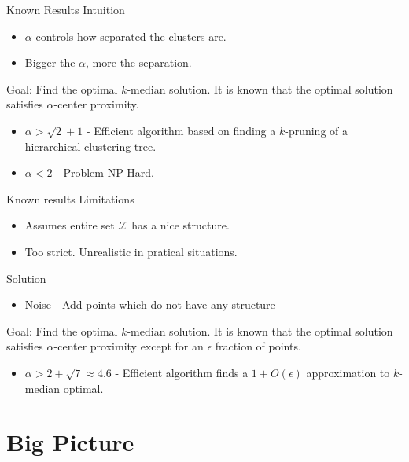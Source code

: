 \documentclass{beamer}
\newcommand{\mc}{\mathcal}
\begin{document}
\begin{frame}{Known Results}
  Intuition
  \begin{itemize}
    \item $\alpha$ controls how separated the clusters are.
    \item Bigger the $\alpha$, more the separation.  
  \end{itemize}
  
  \vspace{0.2in}Goal: Find the optimal $k$-median solution. It is known that the optimal solution satisfies $\alpha$-center proximity. 
  \begin{itemize}
    \item $\alpha > \sqrt{2}+1$ - Efficient algorithm based on finding a $k$-pruning of a hierarchical clustering tree.
    \item $\alpha < 2$ - Problem NP-Hard.  
  \end{itemize}
\end{frame}

\begin{frame}{Known results}
	Limitations
	\begin{itemize}
		\item Assumes entire set $\mc X$ has a nice structure.
		\item Too strict. Unrealistic in pratical situations.
	\end{itemize}
	\vspace{0.1in}Solution
	\begin{itemize}
		\item Noise - Add points which do not have any structure
	\end{itemize}
	\vspace{0.2in}Goal: Find the optimal $k$-median solution. It is known that the optimal solution satisfies $\alpha$-center proximity except for an $\epsilon$ fraction of points. 
  \begin{itemize}
    \item $\alpha > 2+\sqrt{7} \approx 4.6$ - Efficient algorithm  finds a $1+O(\epsilon)$ approximation to $k$-median optimal.
  \end{itemize}
\end{frame}

\section{Big Picture}
\end{document}
